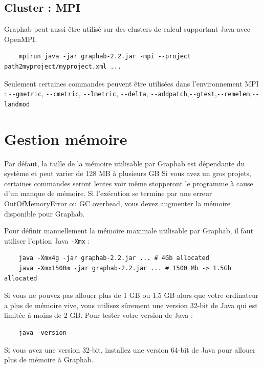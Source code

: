 \documentclass[a4paper,10pt]{report}
\begin{document}
\subsection{Cluster : MPI}
Graphab peut aussi être utilisé sur des clusters de calcul supportant Java avec OpenMPI.
\begin{Verbatim}
	mpirun java -jar graphab-2.2.jar -mpi --project path2myproject/myproject.xml ...
\end{Verbatim}
Seulement certaines commandes peuvent être utilisées dans l'environnement MPI : \verb|--gmetric|, \verb|--cmetric|, \verb|--lmetric|, \verb|--delta|, \verb|--addpatch|,\verb|--gtest|,\verb|--remelem|,\verb|--landmod|

\section{Gestion mémoire}
Par défaut, la taille de la mémoire utilisable par Graphab est dépendante du système et peut varier de 128 MB à plusieurs GB
Si vous avez un gros projets, certaines commandes seront lentes voir même stopperont le programme à cause d'un manque de mémoire.
Si l'exécution se termine par une erreur OutOfMemoryError ou GC overhead, vous devez augmenter la mémoire disponible pour Graphab.

Pour définir manuellement la mémoire maximale utilisable par Graphab, il faut utiliser l'option Java \verb|-Xmx| :
\begin{Verbatim}
	java -Xmx4g -jar graphab-2.2.jar ... # 4Gb allocated
	java -Xmx1500m -jar graphab-2.2.jar ... # 1500 Mb -> 1.5Gb allocated
\end{Verbatim}
Si vous ne pouvez pas allouer plus de 1 GB ou 1.5 GB alors que votre ordinateur a plus de mémoire vive, vous utilisez sûrement une version 32-bit de Java qui est limitée à moins de 2 GB.
Pour tester votre version de Java :
\begin{Verbatim}
	java -version
\end{Verbatim}
Si vous avez une version 32-bit, installez une version 64-bit de Java pour allouer plus de mémoire à Graphab.




\end{document}
